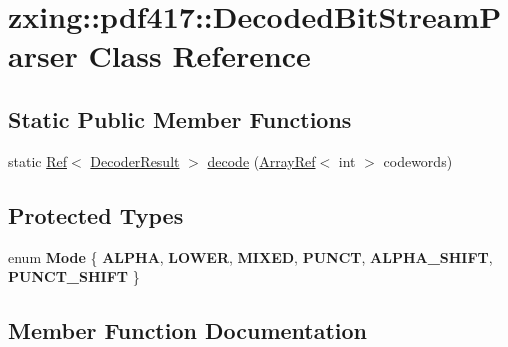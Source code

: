 \hypertarget{classzxing_1_1pdf417_1_1_decoded_bit_stream_parser}{}\section{zxing\+:\+:pdf417\+:\+:Decoded\+Bit\+Stream\+Parser Class Reference}
\label{classzxing_1_1pdf417_1_1_decoded_bit_stream_parser}
\subsection*{Static Public Member Functions}
\begin{DoxyCompactItemize}
\item 
static \mbox{\hyperlink{classzxing_1_1_ref}{Ref}}$<$ \mbox{\hyperlink{classzxing_1_1_decoder_result}{Decoder\+Result}} $>$ \mbox{\hyperlink{classzxing_1_1pdf417_1_1_decoded_bit_stream_parser_a8d507996ce93c72dc78bd99b3b6a9aae}{decode}} (\mbox{\hyperlink{classzxing_1_1_array_ref}{Array\+Ref}}$<$ int $>$ codewords)
\end{DoxyCompactItemize}
\subsection*{Protected Types}
\begin{DoxyCompactItemize}
\item 
\mbox{\label{classzxing_1_1pdf417_1_1_decoded_bit_stream_parser_a15ba72b31c9fb9e71c6f47be82bbef65}} 
enum {\bfseries Mode} \{ \newline
{\bfseries A\+L\+P\+HA}, 
{\bfseries L\+O\+W\+ER}, 
{\bfseries M\+I\+X\+ED}, 
{\bfseries P\+U\+N\+CT}, 
\newline
{\bfseries A\+L\+P\+H\+A\+\_\+\+S\+H\+I\+FT}, 
{\bfseries P\+U\+N\+C\+T\+\_\+\+S\+H\+I\+FT}
 \}
\end{DoxyCompactItemize}


\subsection{Member Function Documentation}
\mbox{\label{classzxing_1_1pdf417_1_1_decoded_bit_stream_parser_a8d507996ce93c72dc78bd99b3b6a9aae}} 
